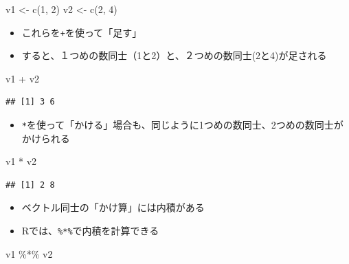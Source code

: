 \documentclass[
]{book}
\newenvironment{Shaded}{\begin{snugshade}}{\end{snugshade}}
\newcommand{\DecValTok}[1]{\textcolor[rgb]{0.00,0.00,0.81}{#1}}
\newcommand{\FunctionTok}[1]{\textcolor[rgb]{0.00,0.00,0.00}{#1}}
\newcommand{\NormalTok}[1]{#1}
\newcommand{\OtherTok}[1]{\textcolor[rgb]{0.56,0.35,0.01}{#1}}
\newcommand{\SpecialCharTok}[1]{\textcolor[rgb]{0.00,0.00,0.00}{#1}}
\providecommand{\tightlist}{%
  \setlength{\itemsep}{0pt}\setlength{\parskip}{0pt}}
\begin{document}
\begin{Shaded}
\begin{Highlighting}[]
\NormalTok{v1 }\OtherTok{\textless{}{-}} \FunctionTok{c}\NormalTok{(}\DecValTok{1}\NormalTok{, }\DecValTok{2}\NormalTok{) }
\NormalTok{v2 }\OtherTok{\textless{}{-}} \FunctionTok{c}\NormalTok{(}\DecValTok{2}\NormalTok{, }\DecValTok{4}\NormalTok{) }
\end{Highlighting}
\end{Shaded}

\begin{itemize}
\tightlist
\item
  これらを\texttt{+}を使って「足す」
\item
  すると、１つめの数同士（1と2）と、２つめの数同士(2と4)が足される
\end{itemize}

\begin{Shaded}
\begin{Highlighting}[]
\NormalTok{v1 }\SpecialCharTok{+}\NormalTok{ v2}
\end{Highlighting}
\end{Shaded}

\begin{verbatim}
## [1] 3 6
\end{verbatim}

\begin{itemize}
\tightlist
\item
  \texttt{*}を使って「かける」場合も、同じように1つめの数同士、2つめの数同士がかけられる
\end{itemize}

\begin{Shaded}
\begin{Highlighting}[]
\NormalTok{v1 }\SpecialCharTok{*}\NormalTok{ v2}
\end{Highlighting}
\end{Shaded}

\begin{verbatim}
## [1] 2 8
\end{verbatim}

\begin{itemize}
\tightlist
\item
  ベクトル同士の「かけ算」には内積がある
\item
  Rでは、\texttt{\%*\%}で内積を計算できる
\end{itemize}

\begin{Shaded}
\begin{Highlighting}[]
\NormalTok{v1 }\SpecialCharTok{\%*\%}\NormalTok{ v2 }
\end{Highlighting}
\end{Shaded}
\end{document}
